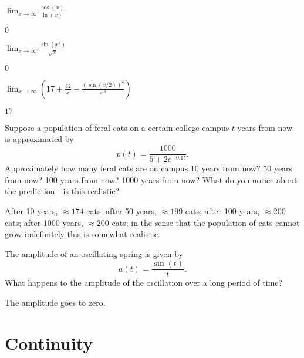 \begin{exercises}
\begin{exercise}
$\lim_{x\to \infty} \frac{\cos(x)}{\ln(x)}$
\begin{answer}
$0$
\end{answer}
\end{exercise}

\begin{exercise}
$\lim_{x\to \infty} \frac{\sin\left(x^7\right)}{\sqrt{x}}$
\begin{answer}
$0$
\end{answer}
\end{exercise}

\begin{exercise}
$\lim_{x\to \infty} \left(17 + \frac{32}{x} - \frac{\left(\sin(x/2)\right)^2}{x^3}\right)$
\begin{answer}
$17$
\end{answer}
\end{exercise}

\endtwocol

\begin{exercise}
Suppose a population of feral cats on a certain college campus $t$
years from now is approximated by
\[
p(t) = \frac{1000}{5+ 2e^{-0.1 t}}.
\]
Approximately how many feral cats are on campus 10 years from now? 50
years from now? 100 years from now? 1000 years from now? What do you
notice about the prediction---is this realistic?
\begin{answer}
After 10 years, $\approx 174$ cats; after 50 years, $\approx 199$
cats; after 100 years, $\approx 200$ cats; after 1000 years, $\approx
200$ cats; in the sense that the population of cats cannot grow
indefinitely this is somewhat realistic.
\end{answer}
\end{exercise}

\begin{exercise}
The amplitude of an oscillating spring is given by
\[
a(t) = \frac{\sin(t)}{t}.
\]
What happens to the amplitude of the oscillation over a long period of
time?
\begin{answer}
The amplitude goes to zero. 
\end{answer}
\end{exercise}
\end{exercises}




\section{Continuity}



